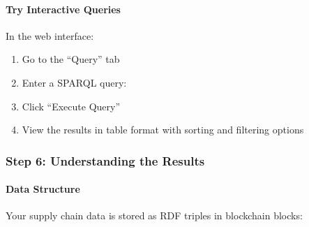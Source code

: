\documentclass[letterpaper,10pt,english]{sphinxmanual}
\begin{document}
\paragraph{Try Interactive Queries}
\label{\detokenize{user-guide/first-steps:try-interactive-queries}}
\sphinxAtStartPar
In the web interface:
\begin{enumerate}
%
\item {} 
\sphinxAtStartPar
Go to the “Query” tab

\item {} 
\sphinxAtStartPar
Enter a SPARQL query:

\begin{sphinxVerbatim}[commandchars=\\\{\}]
     
     
           
           
\end{sphinxVerbatim}

\item {} 
\sphinxAtStartPar
Click “Execute Query”

\item {} 
\sphinxAtStartPar
View the results in table format with sorting and filtering options

\end{enumerate}


\subsubsection{Step 6: Understanding the Results}
\label{\detokenize{user-guide/first-steps:step-6-understanding-the-results}}

\paragraph{Data Structure}
\label{\detokenize{user-guide/first-steps:data-structure}}
\sphinxAtStartPar
Your supply chain data is stored as RDF triples in blockchain blocks:

\begin{sphinxVerbatim}[commandchars=\\\{\}]
 
     
                
                

     
            
\end{sphinxVerbatim}
\end{document}

